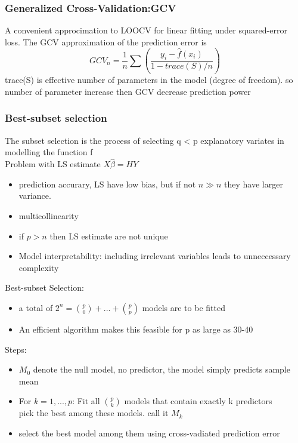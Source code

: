 \documentclass[10pt]{article}
\theoremstyle{break}
\begin{document}
        \subsubsection{Generalized Cross-Validation:GCV}
            A convenient approcimation to LOOCV for linear fitting under squared-error loss. The GCV approximation of the prediction error is 
            $$GCV_n = \frac{1}{n}\sum\left(\frac{y_i-\hat{f}(x_i)}{1-trace(S)/n}\right)$$
            trace(S) is effective number of parameters in the model (degree of freedom). so number of parameter increase then GCV decrease prediction power 
        \subsubsection{Best-subset selection}
            The subset selection is the process of selecting q < p explanatory variates in modelling the function f 
            \\Problem with LS estimate $X\hat{\beta}=HY$
            \begin{itemize}
                \item prediction accurary, LS have low bias, but if not $n \gg n$ they have larger variance.
                \item multicollinearity 
                \item if $p>n$ then LS estimate are not unique 
                \item Model interpretability: including irrelevant variables leads to unneccessary complexity 
            \end{itemize}
            {\Large Best-subset Selection:}

            \begin{itemize}
                \item a total of $2^n=\binom{p}{0} +...+ \binom{p}{p}$ models are to be fitted
                \item An efficient algorithm makes this feasible for p as large as 30-40 
            \end{itemize}
            Steps:
            \begin{itemize}
                \item $M_0$ denote the null model, no predictor, the model simply predicts sample mean 
                \item For $k=1,...,p$: Fit all $\binom{p}{k}$ models that contain exactly k predictors
                \\pick the best among these models. call it $M_k$ 
                \item select the best model among them using cross-vadiated prediction error
            \end{itemize}
\end{document}
